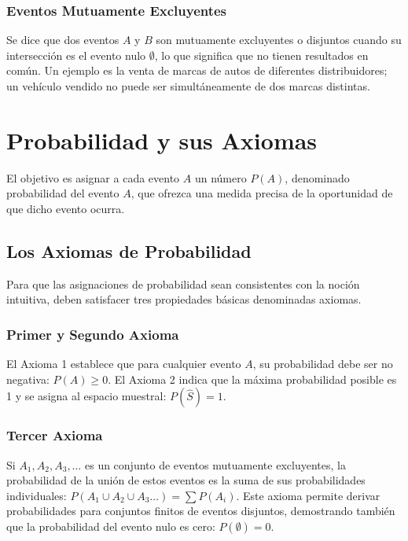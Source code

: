 \documentclass[a4paper]{article}
\begin{document}
\subsubsection{Eventos Mutuamente Excluyentes}

Se dice que dos eventos $A$ y $B$ son mutuamente excluyentes o disjuntos cuando su intersección es el evento nulo $\emptyset$, lo que significa que no tienen resultados en común. Un ejemplo es la venta de marcas de autos de diferentes distribuidores; un vehículo vendido no puede ser simultáneamente de dos marcas distintas.

\section{Probabilidad y sus Axiomas}

El objetivo es asignar a cada evento $A$ un número $P(A)$, denominado probabilidad del evento $A$, que ofrezca una medida precisa de la oportunidad de que dicho evento ocurra.

\subsection{Los Axiomas de Probabilidad}

Para que las asignaciones de probabilidad sean consistentes con la noción intuitiva, deben satisfacer tres propiedades básicas denominadas axiomas.

\subsubsection{Primer y Segundo Axioma}

El Axioma 1 establece que para cualquier evento $A$, su probabilidad debe ser no negativa: $P(A) \geq 0$. El Axioma 2 indica que la máxima probabilidad posible es 1 y se asigna al espacio muestral: $P(\hat{S}) = 1$.

\subsubsection{Tercer Axioma}

Si $A_1, A_2, A_3, \dots$ es un conjunto de eventos mutuamente excluyentes, la probabilidad de la unión de estos eventos es la suma de sus probabilidades individuales: $P(A_1 \cup A_2 \cup A_3 \dots) = \sum P(A_i)$. Este axioma permite derivar probabilidades para conjuntos finitos de eventos disjuntos, demostrando también que la probabilidad del evento nulo es cero: $P(\emptyset) = 0$.
\end{document}
